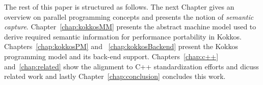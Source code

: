 The rest of this paper is structured as follows. The next Chapter gives an overview on parallel programming concepts and presents the notion of \emph{semantic capture}. Chapter~\ref{chap:kokkosMM} presents the abstract machine model used to derive required semantic information for performance portability in Kokkos. Chapters~\ref{chap:kokkosPM} and ~\ref{chap:kokkosBackend} present the Kokkos programming model and its back-end support. Chapters~\ref{chap:c++} and~\ref{chap:related} show the alignment to C++ standardization efforts and dicuss related work and lastly Chapter~\ref{chap:conclusion} concludes this work.
